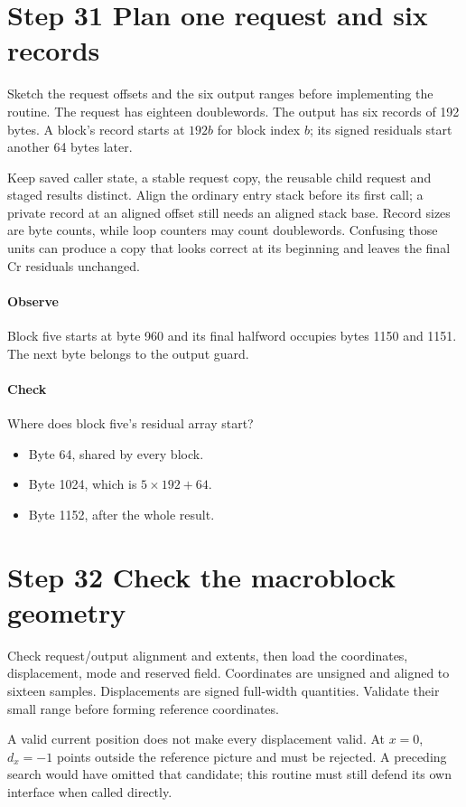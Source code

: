\section{Step 31 Plan one request and six records}\label{h263-macroblock-s01}
Sketch the request offsets and the six output ranges before implementing the
routine. The request has eighteen doublewords. The output has six records of
192 bytes. A block's record starts at $192b$ for block index $b$; its signed
residuals start another 64 bytes later.

Keep saved caller state, a stable request copy, the reusable child request and
staged results distinct. Align the ordinary entry stack before its first call;
a private record at an aligned offset still needs an aligned stack base.
Record sizes are byte counts, while loop counters may
count doublewords. Confusing those units can produce a copy that looks correct
at its beginning and leaves the final Cr residuals unchanged.

\paragraph{Observe} Block five starts at byte 960 and its final halfword occupies
bytes 1150 and 1151. The next byte belongs to the output guard.
\paragraph{Check} Where does block five's residual array start?
\begin{itemize}
  \item[A.] Byte 64, shared by every block.
  \item[B.] Byte 1024, which is $5\times192+64$.
  \item[C.] Byte 1152, after the whole result.
\end{itemize}

\section{Step 32 Check the macroblock geometry}\label{h263-macroblock-s02}
Check request/output alignment and extents, then load the coordinates,
displacement, mode and reserved field. Coordinates are unsigned and aligned to
sixteen samples. Displacements are signed full-width quantities. Validate their
small range before forming reference coordinates.

A valid current position does not make every displacement valid. At $x=0$,
$d_x=-1$ points outside the reference picture and must be rejected. A preceding
search would have omitted that candidate; this routine must still defend its
own interface when called directly.

